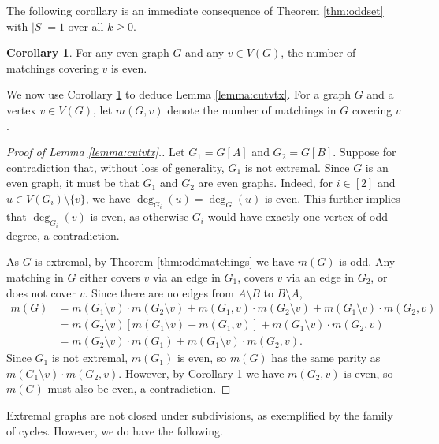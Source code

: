 \documentclass{amsart}
\theoremstyle{definition}
\newtheorem{corollary}[theorem]{Corollary}
\theoremstyle{remark}
\begin{document}
The following corollary is an immediate consequence of Theorem \ref{thm:oddset} with $|S|=1$ over all $k\ge 0$.

\begin{corollary}\label{cor:vtxcover}
    For any even graph $G$ and any $v\in V(G)$, the number of matchings covering $v$ is even.
\end{corollary}

We now use Corollary \ref{cor:vtxcover} to deduce Lemma \ref{lemma:cutvtx}. For a graph $G$ and a vertex $v\in V(G)$, let $m(G, v)$ denote the number of matchings in $G$ covering $v$.

\begin{proof}[Proof of Lemma \ref{lemma:cutvtx}.]
    Let $G_1 = G[A]$ and $G_2 = G[B]$. Suppose for contradiction that, without loss of generality, $G_1$ is not extremal. Since $G$ is an even graph, it must be that $G_1$ and $G_2$ are even graphs. Indeed, for $i\in [2]$ and $u \in V(G_i)\setminus\{v\}$, we have $\deg_{G_i}(u) = \deg_G(u)$ is even. This further implies that $\deg_{G_i}(v)$ is even, as otherwise $G_i$ would have exactly one vertex of odd degree, a contradiction.  
    
    As $G$ is extremal, by Theorem \ref{thm:oddmatchings} we have $m(G)$ is odd. Any matching in $G$ either covers $v$ via an edge in $G_1$, covers $v$ via an edge in $G_2$, or does not cover $v$. Since there are no edges from $A\setminus B$ to $B\setminus A$,
    \begin{align*}
        m(G) &= m(G_1\setminus v)\cdot m(G_2\setminus v) + m(G_1, v)\cdot m(G_2\setminus v) + m(G_1\setminus v)\cdot m(G_2, v)
        \\&= m(G_2\setminus v)[m(G_1\setminus v) + m(G_1, v)] + m(G_1\setminus v)\cdot m(G_2,v)
        \\&= m(G_2\setminus v)\cdot m(G_1) + m(G_1\setminus v)\cdot m(G_2, v).
    \end{align*}
    Since $G_1$ is not extremal, $m(G_1)$ is even, so $m(G)$ has the same parity as $m(G_1\setminus v)\cdot m(G_2, v)$. However, by Corollary \ref{cor:vtxcover} we have $m(G_2, v)$ is even, so $m(G)$ must also be even, a contradiction.
\end{proof}

Extremal graphs are not closed under subdivisions, as exemplified by the family of cycles. However, we do have the following.
\end{document}
